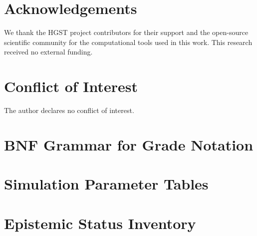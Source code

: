 \documentclass[12pt,a4paper]{article}
\theoremstyle{plain}
\theoremstyle{definition}
\theoremstyle{remark}
\begin{document}

\section*{Acknowledgements}
We thank the HGST project contributors for their support and the open-source scientific community for the computational tools used in this work.
This research received no external funding.

\section*{Conflict of Interest}
The author declares no conflict of interest.






\appendix



\section{BNF Grammar for Grade Notation}
\label{app:grammar}


\section{Simulation Parameter Tables}
\label{app:tables}



\section{Epistemic Status Inventory}
\label{app:epistemic}
\end{document}
